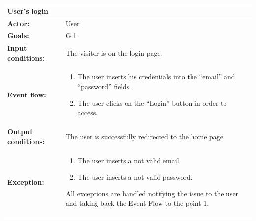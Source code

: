 \begin{tabular} { p{5cm} p{8cm} } 
\textbf{User's login} & \\
\hline
\textbf{Actor:} & User \\ 
\textbf{Goals:} & G.1 \\ 
\textbf{Input conditions:} & The visitor is on the login page. \\
\textbf{Event flow:} & \begin{enumerate}
				\item
				The user inserts his credentials into the “email” and “password” fields.
				\item
				The user clicks on the “Login” button in order to access.
			\end{enumerate} \\ 
\textbf{Output conditions:} & The user is successfully redirected to the
home page.\\ 
\textbf{Exception:} & \begin{enumerate}
				\item
				The user inserts a not valid email.
				\item
				The user inserts a not valid password.
			\end{enumerate}
All exceptions are handled notifying the issue to the user and taking back the Event Flow to the point 1. \\
\hline
\end{tabular}


